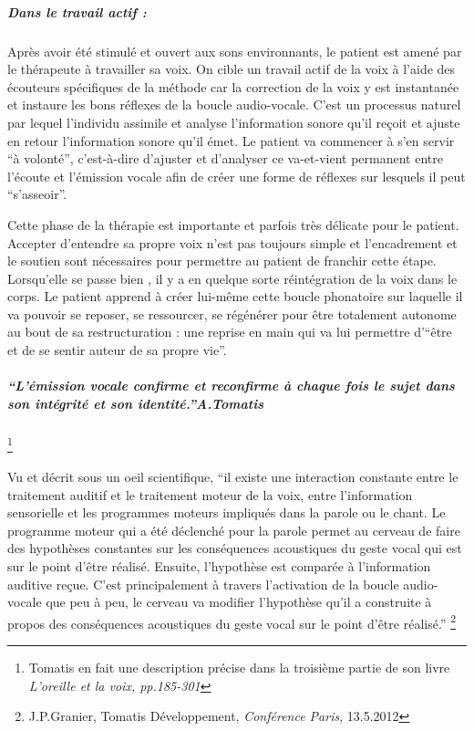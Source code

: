 \subparagraph{Dans le travail actif :}

Après avoir été stimulé et ouvert aux sons environnants, le patient
est amené par le thérapeute à travailler sa voix. On cible un travail
actif de la voix à l'aide des écouteurs spécifiques de la méthode
car la correction de la voix y est instantanée et instaure les bons
réflexes de la boucle audio-vocale. C'est un processus naturel par
lequel l'individu assimile et analyse l'information sonore qu'il reçoit
et ajuste en retour l'information sonore qu'il émet. Le patient va
commencer à s'en servir ``à volonté'', c'est-à-dire d'ajuster et
d'analyser ce va-et-vient permanent entre l'écoute et l'émission vocale
afin de créer une forme de réflexes sur lesquels il peut ``s'asseoir''. 

Cette phase de la thérapie est importante et parfois très délicate
pour le patient. Accepter d'entendre sa propre voix n'est pas toujours
simple et l'encadrement et le soutien sont nécessaires pour permettre
au patient de franchir cette étape. Lorsqu'elle se passe bien , il
y a en quelque sorte réintégration de la voix dans le corps. Le patient
apprend à créer lui-même cette boucle phonatoire sur laquelle il va
pouvoir se reposer, se ressourcer, se régénérer pour être totalement
autonome au bout de sa restructuration : une reprise en main qui va
lui permettre d'``être et de se sentir auteur de sa propre vie''. 

\subparagraph{\textmd{\emph{``L'émission vocale confirme et reconfirme à chaque
fois le sujet dans son intégrité et son identité.''A.Tomatis}}}

\footnote{Tomatis en fait une description précise dans la troisième partie de
son livre\emph{ L'oreille et la voix, pp.185-301}}

Vu et décrit sous un oeil scientifique, ``il existe une interaction
constante entre le traitement auditif et le traitement moteur de la
voix, entre l'information sensorielle et les programmes moteurs impliqués
dans la parole ou le chant. Le programme moteur qui a été déclenché
pour la parole permet au cerveau de faire des hypothèses constantes
sur les conséquences acoustiques du geste vocal qui est sur le point
d'être réalisé. Ensuite, l'hypothèse est comparée à l'information
auditive reçue. C'est principalement à travers l'activation de la
boucle audio-vocale que peu à peu, le cerveau va modifier l'hypothèse
qu'il a construite à propos des conséquences acoustiques du geste
vocal sur le point d'être réalisé.'' \footnote{J.P.Granier, Tomatis Développement,\emph{ Conférence Paris}, 13.5.2012}
